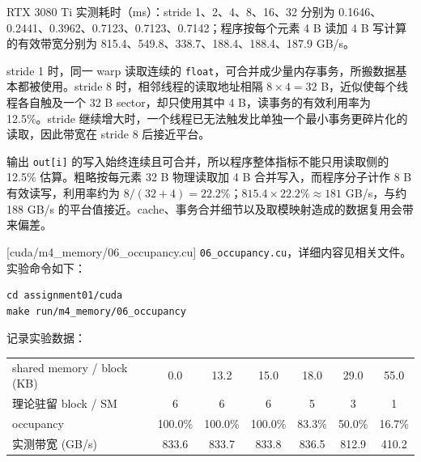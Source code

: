 \documentclass[11pt,a4paper,fontset=none]{ctexart}
\begin{document}
\begin{tcolorbox}[title={4.7 实验记录与趋势分析}]
RTX 3080 Ti 实测耗时（ms）：stride 1、2、4、8、16、32 分别为 0.1646、0.2441、0.3962、0.7123、0.7123、0.7142；程序按每个元素 4 B 读加 4 B 写计算的有效带宽分别为 815.4、549.8、338.7、188.4、188.4、187.9 GB/s。

stride 1 时，同一 warp 读取连续的 \texttt{float}，可合并成少量内存事务，所搬数据基本都被使用。stride 8 时，相邻线程的读取地址相隔 $8\times4=32$ B，近似使每个线程各自触及一个 32 B sector，却只使用其中 4 B，读事务的有效利用率为 12.5\%。stride 继续增大时，一个线程已无法触发比单独一个最小事务更碎片化的读取，因此带宽在 stride 8 后接近平台。

输出 \texttt{out[i]} 的写入始终连续且可合并，所以程序整体指标不能只用读取侧的 12.5\% 估算。粗略按每元素 32 B 物理读取加 4 B 合并写入，而程序分子计作 8 B 有效读写，利用率约为 $8/(32+4)=22.2\%$；$815.4\times22.2\%\approx181$ GB/s，与约 188 GB/s 的平台值接近。cache、事务合并细节以及取模映射造成的数据复用会带来偏差。
\end{tcolorbox}

[cuda/m4\_memory/06\_occupancy.cu]
\texttt{06\_occupancy.cu}，详细内容见相关文件。实验命令如下：

\begin{lstlisting}
cd assignment01/cuda
make run/m4_memory/06_occupancy
\end{lstlisting}

记录实验数据：

\begin{center}\small
\begin{tabular}{@{}lcccccc@{}}
\toprule
shared memory / block (KB) & 0.0 & 13.2 & 15.0 & 18.0 & 29.0 & 55.0 \\
理论驻留 block / SM & 6 & 6 & 6 & 5 & 3 & 1 \\
occupancy & 100.0\% & 100.0\% & 100.0\% & 83.3\% & 50.0\% & 16.7\% \\
实测带宽 (GB/s) & 833.6 & 833.7 & 833.8 & 836.5 & 812.9 & 410.2 \\
\bottomrule
\end{tabular}
\end{center}
\end{document}
